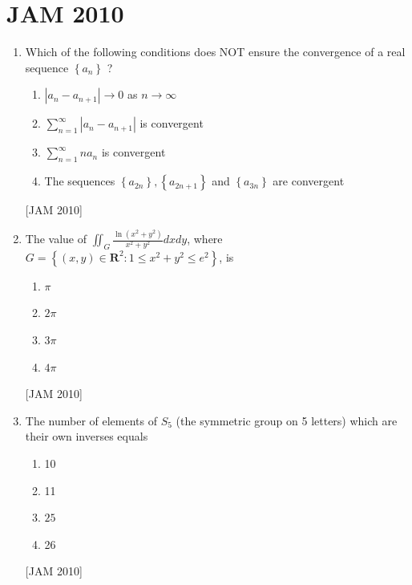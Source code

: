 \newpage
\section{JAM 2010}

\begin{enumerate}


\item  Which of the following conditions does NOT ensure the convergence of a real sequence $\left\{a_{n}\right\}$ ? 

\begin{enumerate}
    
\item $\left|a_{n}-a_{n+1}\right| \rightarrow 0$ as $n \rightarrow \infty$ 
\item $\sum_{n=1}^{\infty}\left|a_{n}-a_{n+1}\right|$ is convergent 
\item $\sum_{n=1}^{\infty} n a_{n}$ is convergent 
\item The sequences $\left\{a_{2 n}\right\},\left\{a_{2 n+1}\right\}$ and $\left\{a_{3 n}\right\}$ are convergent
\end{enumerate}
\hfill [JAM 2010]




\item  The value of $\iint_{G} \frac{\ln \left(x^{2}+y^{2}\right)}{x^{2}+y^{2}} d x d y$, where $G=\left\{(x, y) \in \mathbf{R}^{2}: 1 \leq x^{2}+y^{2} \leq e^{2}\right\}$, is 

\begin{enumerate}
    
\item $\pi$ 
\item $ 2 \pi$ 
\item $3 \pi$ 
\item $4 \pi$

\end{enumerate}
\hfill [JAM 2010]



\item  The number of elements of $S_{5}$ (the symmetric group on 5 letters) which are their own inverses equals 

\begin{enumerate}
    \item 10 
\item 11 
\item $ 25$ 
\item 26

\end{enumerate}
\hfill [JAM 2010]





\end{enumerate}
